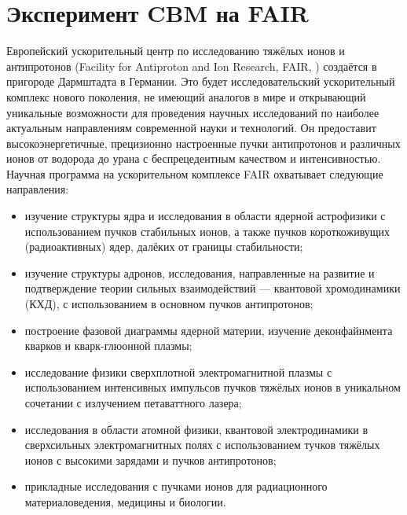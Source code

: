\chapter{Эксперимент CBM на FAIR}\label{sec:secCbm}




Европейский ускорительный центр по исследованию тяжёлых ионов и антипротонов (Facility for Antiproton and Ion Research, FAIR, \cite{FAIR}) создаётся в пригороде Дармштадта в Германии. Это будет исследовательский ускорительный комплекс нового поколения, не имеющий аналогов в мире и открывающий уникальные возможности для проведения научных исследований по наиболее актуальным направлениям современной науки и технологий. Он предоставит высокоэнергетичные, прецизионно настроенные пучки антипротонов и различных ионов от водорода до урана с беспрецедентным качеством и интенсивностью.
Научная программа на ускорительном комплексе FAIR охватывает следующие направления:
\begin{itemize}
\item изучение структуры ядра и исследования в области ядерной астрофизики с использованием пучков стабильных ионов, а также пучков короткоживущих (радиоактивных) ядер, далёких от границы стабильности;
\item изучение структуры адронов, исследования, направленные на развитие и подтверждение теории сильных взаимодействий --- квантовой хромодинамики (КХД), с использованием в основном пучков антипротонов;
\item построение фазовой диаграммы ядерной материи, изучение деконфайнмента кварков и кварк-глюонной плазмы;
\item исследование физики сверхплотной электромагнитной плазмы с использованием интенсивных импульсов пучков тяжёлых ионов в уникальном сочетании с излучением петаваттного лазера;
\item исследования в области атомной физики, квантовой электродинамики в сверхсильных электромагнитных полях с использованием тучков тяжёлых ионов с высокими зарядами и пучков антипротонов;
\item прикладные исследования с пучками ионов для радиационного материаловедения, медицины и биологии.
\end{itemize}

